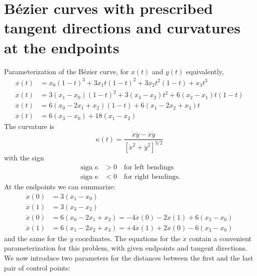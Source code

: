 \documentclass{article}
\newcommand{\sign}{\operatorname{sign}}
\begin{document}
\section{B\'ezier curves with prescribed tangent directions and curvatures at the endpoints}

Parameterization of the B\'ezier curve, for $x(t)$ and $y(t)$ equivalently,
%
\begin{align}
  x(t) &= x_0(1-t)^3 + 3x_1t(1-t)^2 + 3x_2t^2(1-t) + x_3 t^3\\
  \dot x(t) &= 3(x_1-x_0)(1-t)^2 + 3(x_3-x_2)t^2 + 6(x_2-x_1)t(1-t) \\
  \ddot x(t) &= 6(x_0 - 2x_1 + x_2)(1-t) + 6(x_1-2x_2+x_3) t \\
  \dddot x(t) &= 6(x_3-x_0) + 18(x_1-x_2)
\end{align}
%
The curvature is
\begin{equation}
  \kappa(t) = \frac{\dot x\ddot y - \ddot x\dot y}{[\dot x^2 + \dot y^2]^{3/2}}
\end{equation}
%
with the sign
%
\begin{equation}
  \begin{aligned}
    \sign\kappa &> 0 \quad\text{for left bendings}\\
    \sign\kappa &< 0 \quad\text{for right bendings.}
  \end{aligned}
\end{equation}
%
At the endpoints we can summarize:
%
\begin{align}
  \dot x(0)  &= 3(x_1 - x_0) \\
  \dot x(1)  &= 3(x_3 - x_2) \\
  \ddot x(0) &= 6(x_0 - 2x_1 + x_2) = -4\dot x(0) - 2\dot x(1) + 6(x_3 - x_0) \\
  \ddot x(1) &= 6(x_1 - 2x_2 + x_3) = +4\dot x(1) + 2\dot x(0) - 6(x_3 - x_0)
\end{align}
%
and the same for the $y$ coordinates.
The equations for the $\ddot x$ contain a convenient parameterization for this
problem, with given endpoints and tangent directions. We now introduce two
parameters for the distances between the first and the last pair of control
points:
%
\end{document}
